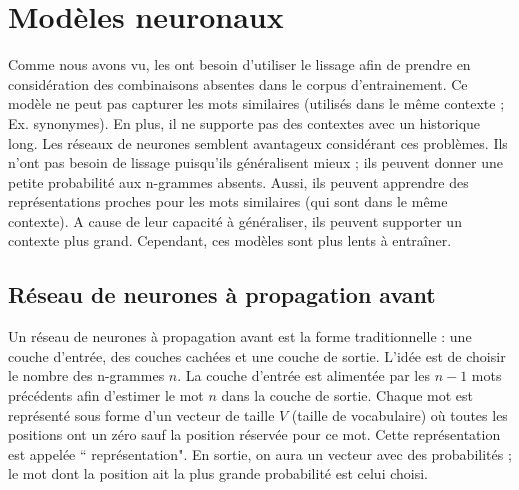 \documentclass{KodeBook}
\begin{document}
\section{Modèles neuronaux}

Comme nous avons vu, les  ont besoin d'utiliser le lissage afin de prendre en considération des combinaisons absentes dans le corpus d'entrainement. 
Ce modèle ne peut pas capturer les mots similaires (utilisés dans le même contexte ; Ex. synonymes). 
En plus, il ne supporte pas des contextes avec un historique long. 
Les réseaux de neurones semblent avantageux considérant ces problèmes. 
Ils n'ont pas besoin de lissage puisqu'ils généralisent mieux ; ils peuvent donner une petite probabilité aux n-grammes absents. 
Aussi, ils peuvent apprendre des représentations proches pour les mots similaires (qui sont dans le  même contexte). 
A cause de leur capacité à généraliser, ils peuvent supporter un contexte plus grand. 
Cependant, ces modèles sont plus lents à entraîner.

\subsection{Réseau de neurones à propagation avant}

Un réseau de neurones à propagation avant est la forme traditionnelle : une couche d'entrée, des couches cachées et une couche de sortie. 
L'idée est de choisir le nombre des n-grammes $n$. 
La couche d'entrée est alimentée par les $n-1$ mots précédents afin d'estimer le mot $n$ dans la couche de sortie. 
Chaque mot est représenté sous forme d'un vecteur de taille $V$ (taille de vocabulaire) où toutes les positions ont un zéro sauf la position réservée pour ce mot. 
Cette représentation est appelée `` représentation". 
En sortie, on aura un vecteur avec des probabilités ; le mot dont la position ait la plus grande probabilité est celui choisi. 
\end{document}
